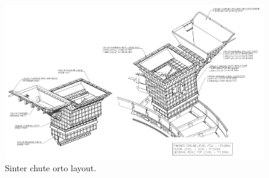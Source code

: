 \begin{figure}[!htb]
\centering
\includegraphics[width=.80\columnwidth]{057sinterChuteOrtoLayout}
\caption[Sinter chute orto layout]{Sinter chute orto layout.}
\label{fig:057sinterChuteOrtoLayout}
\end{figure}